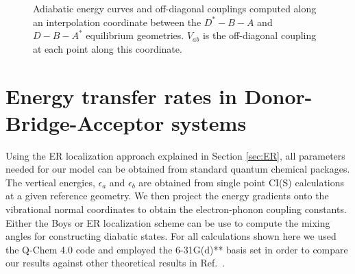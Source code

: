 \begin{figure}[!ht]
\caption{Adiabatic energy curves and off-diagonal couplings computed along an interpolation coordinate between the
$D^{*}-B-A$ and $D-B-A^{*}$ equilibrium geometries.  $V_{ab}$ is the off-diagonal coupling at each point along this coordinate.} \label{parabs}
\end{figure}





\section{Energy transfer rates in  Donor-Bridge-Acceptor systems}


Using the ER localization approach explained in Section \ref{sec:ER}, all parameters needed for our model can be  obtained from
standard  quantum chemical packages.   The vertical energies, $\epsilon_{a}$
and $\epsilon_{b}$ are obtained from single point CI(S) calculations at a given
reference geometry.   We then project the energy gradients onto the vibrational normal
coordinates to obtain the electron-phonon coupling constants.  Either the Boys or ER
localization scheme can be use to compute the mixing
angles for constructing diabatic states. For all calculations shown here we
used the Q-Chem 4.0 \cite{QCHEM4} code and employed the 6-31G(d){*}{*} basis set
in order to compare our results  against other theoretical results in  Ref.~\cite{subotnik2010predicting}.

